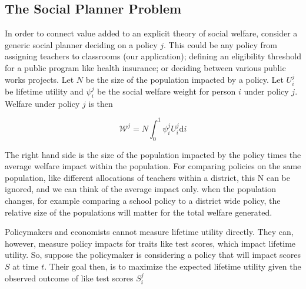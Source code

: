 \documentclass[12pt]{article}
\theoremstyle{definition}
\theoremstyle{definition}
\theoremstyle{definition}
\theoremstyle{definition}
\begin{document}
\subsection{The Social Planner Problem}

    
    
    
    In order to connect value added to an explicit theory of social welfare, consider a generic social planner deciding on a policy $j$. This could be any policy from assigning teachers to classrooms (our application);  defining an eligibility threshold for a public program like health insurance; or deciding between various public works projects. Let $N$ be the size of the population impacted by a policy. Let $U^j_i$ be lifetime utility and $\psi^j_i$ be the social welfare weight for person $i$ under policy $j$. Welfare under policy $j$ is then
        
        \begin{equation}
        \mathcal{W}^j = N \int_0^1 \psi^j_i U^j_i \text{d}i
        \end{equation}
    
    The right hand side is the size of the population impacted by the policy times the average welfare impact within the population. For comparing policies on the same population, like different allocations of teachers within a district, this N can be ignored, and we can think of the average impact only. when the population changes, for example comparing a school policy to a district wide policy, the relative size of the populations will matter for the total welfare generated. 




  Policymakers and economists cannot measure lifetime utility directly. They can, however, measure policy impacts for traits like test scores, which impact lifetime utility. So, suppose the policymaker is considering a policy that will impact scores $S$ at time $t$. Their goal then, is to maximize the expected lifetime utility given the observed outcome of like test scores $S_i^j$
  
\end{document}
